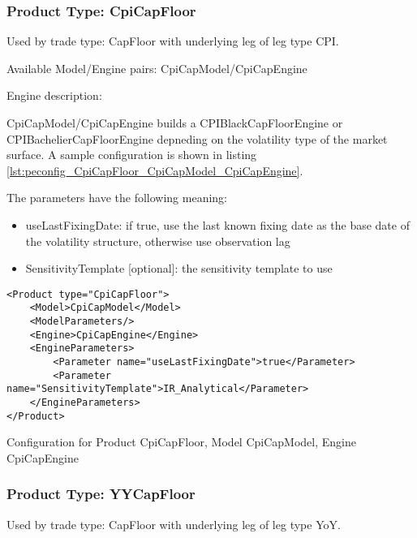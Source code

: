 \subsubsection{Product Type: CpiCapFloor}

Used by trade type: CapFloor with underlying leg of leg type CPI.

Available Model/Engine pairs: CpiCapModel/CpiCapEngine

Engine description:

CpiCapModel/CpiCapEngine builds a CPIBlackCapFloorEngine or CPIBachelierCapFloorEngine depneding on the volatility type
of the market surface. A sample configuration is shown in listing
\ref{lst:peconfig_CpiCapFloor_CpiCapModel_CpiCapEngine}.

The parameters have the following meaning:

\begin{itemize}
\item useLastFixingDate: if true, use the last known fixing date as the base date of the volatility structure, otherwise
  use observation lag
\item SensitivityTemplate [optional]: the sensitivity template to use 
\end{itemize}

\begin{longlisting}
\begin{verbatim}
<Product type="CpiCapFloor">
    <Model>CpiCapModel</Model>
    <ModelParameters/>
    <Engine>CpiCapEngine</Engine>
    <EngineParameters>
        <Parameter name="useLastFixingDate">true</Parameter>
        <Parameter name="SensitivityTemplate">IR_Analytical</Parameter>
    </EngineParameters>
</Product>
\end{verbatim}
\caption{Configuration for Product CpiCapFloor, Model CpiCapModel, Engine CpiCapEngine}
\label{lst:peconfig_CpiCapFloor_CpiCapModel_CpiCapEngine}
\end{longlisting}

\subsubsection{Product Type: YYCapFloor}

Used by trade type: CapFloor with underlying leg of leg type YoY.

